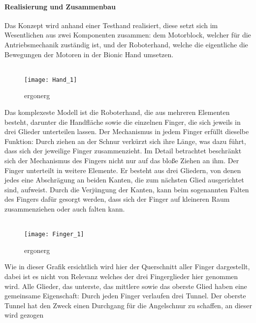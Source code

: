 \documentclass[titlepage,12pt,twoside]{article}
\begin{document}
\paragraph{Realisierung und Zusammenbau}
\hfill \break
\hfill \break
Das Konzept wird anhand einer Testhand realisiert, diese setzt sich im Wesentlichen 
aus zwei Komponenten zusammen: dem Motorblock, welcher für die Antriebsmechanik 
zuständig ist, und der Roboterhand, welche die eigentliche die Bewegungen der Motoren 
in der Bionic Hand umsetzen. \\
\\
\begin{figure}[H]
	\begin{center}
		\scalebox{1}
		{\texttt{[image: Hand\_1]}}
		\caption{ergonerg}
		\label{fig:Hand_1}		
	\end{center}
\end{figure}
\hfill \break
Das komplexeste Modell ist die Roboterhand, die aus mehreren Elementen besteht, 
darunter die Handfläche sowie die einzelnen Finger, die sich jeweils in drei Glieder 
unterteilen lassen. Der Mechanismus in jedem Finger erfüllt dieselbe Funktion: Durch 
ziehen an der Schnur verkürzt sich ihre Länge, was dazu führt, dass sich der 
jeweilige Finger zusammenzieht. Im Detail betrachtet beschränkt sich der Mechanismus 
des Fingers nicht nur auf das bloße Ziehen an ihm. Der Finger unterteilt in weitere 
Elemente. Er besteht aus drei Gliedern, von denen jedes eine Abschrägung an beiden 
Kanten, die zum nächsten Glied ausgerichtet sind, aufweist. Durch die Verjüngung der 
Kanten, kann beim sogenannten Falten des Fingers dafür gesorgt werden, dass sich der 
Finger auf kleineren Raum zusammenziehen oder auch falten kann. \\
\\
\begin{figure}[H]
	\begin{center}
		\scalebox{1}
		{\texttt{[image: Finger\_1]}}
		\caption{ergonerg}
		\label{fig:Finger_1}		
	\end{center}
\end{figure}
\hfill \break
Wie in dieser Grafik ersichtlich wird hier der Querschnitt aller Finger dargestellt, 
dabei ist es nicht von Relevanz welches der drei Fingerglieder hier genommen wird. 
Alle Glieder, das unterste, das mittlere sowie das oberste Glied haben eine 
gemeinsame Eigenschaft: Durch jeden Finger verlaufen drei Tunnel. Der oberste Tunnel 
hat den Zweck einen Durchgang für die Angelschnur zu schaffen, an dieser wird gezogen 
\end{document}
